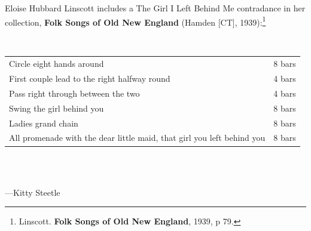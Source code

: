 \documentclass[11pt]{article}
\begin{document}
{\begin{minipage}{7.0in}
    Eloise Hubbard Linscott includes a The Girl I Left Behind Me
    contradance in her collection, \textbf{Folk Songs of Old New England} (Hamden
    [CT], 1939):\footnote{Linscott. \textbf{Folk Songs of Old New England}, 1939, p 79.}

    {\parindent0pt
      \raggedright
      ~\\
      \begin{tabular}{ll}
        Circle eight hands around & 8 bars \\
        First couple lead to the right halfway round & 4 bars \\
        Pass right through between the two & 4 bars \\
        Swing the girl behind you & 8 bars \\
        Ladies grand chain & 8 bars \\
        All promenade with the dear little maid, that girl you left behind you & 8 bars \\
      \end{tabular}
      ~\\
    }
    ~\\
    ---Kitty Steetle
    
  \end{minipage}
  \vspace*{\fill}
}
\end{document}
